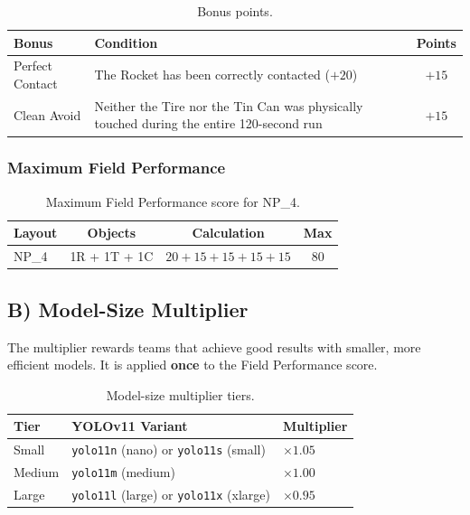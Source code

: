 \documentclass[a4]{article}
\begin{document}
\begin{table}[H]
\centering
\begin{tabular}{p{4cm}p{7cm}c}
\toprule
\textbf{Bonus} & \textbf{Condition} & \textbf{Points} \\
\midrule
Perfect Contact & The Rocket has been correctly contacted ($+20$) & $+15$ \\
Clean Avoid & Neither the Tire nor the Tin Can was physically touched during the entire 120-second run & $+15$ \\
\bottomrule
\end{tabular}
\caption{Bonus points.}
\end{table}

\subsubsection*{Maximum Field Performance}

\begin{table}[H]
\centering
\begin{tabular}{lccc}
\toprule
\textbf{Layout} & \textbf{Objects} & \textbf{Calculation} & \textbf{Max} \\
\midrule
NP\_4 & 1R + 1T + 1C & $20 + 15 + 15 + 15 + 15$ & 80 \\
\bottomrule
\end{tabular}
\caption{Maximum Field Performance score for NP\_4.}
\end{table}

\subsection*{B) Model-Size Multiplier}

The multiplier rewards teams that achieve good results with smaller, more efficient models. It is applied \textbf{once} to the Field Performance score.

\begin{table}[H]
\centering
\begin{tabular}{lll}
\toprule
\textbf{Tier} & \textbf{YOLOv11 Variant} & \textbf{Multiplier} \\
\midrule
Small & \texttt{yolo11n} (nano) or \texttt{yolo11s} (small) & $\times 1.05$ \\
Medium & \texttt{yolo11m} (medium) & $\times 1.00$ \\
Large & \texttt{yolo11l} (large) or \texttt{yolo11x} (xlarge) & $\times 0.95$ \\
\bottomrule
\end{tabular}
\caption{Model-size multiplier tiers.}
\end{table}
\end{document}
